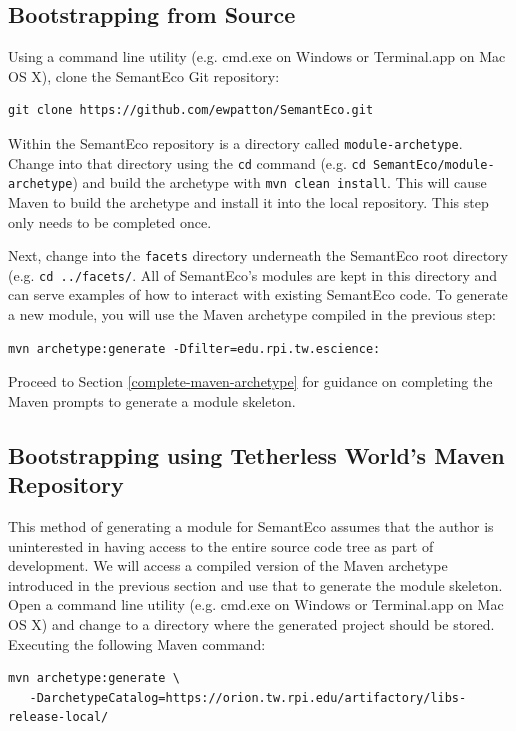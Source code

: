 \documentclass[letterpaper]{report}
\begin{document}
\subsection{Bootstrapping from Source}
Using a command line utility (e.g. cmd.exe on Windows or Terminal.app on Mac OS X), clone the SemantEco Git repository:

\begin{verbatim}
git clone https://github.com/ewpatton/SemantEco.git
\end{verbatim}

Within the SemantEco repository is a directory called \texttt{module-archetype}. Change into that directory using the \texttt{cd} command (e.g. \texttt{cd SemantEco/module-archetype}) and build the archetype with \texttt{mvn clean install}. This will cause Maven to build the archetype and install it into the local repository. This step only needs to be completed once.

Next, change into the \texttt{facets} directory underneath the SemantEco root directory (e.g. \texttt{cd ../facets/}. All of SemantEco's modules are kept in this directory and can serve examples of how to interact with existing SemantEco code. To generate a new module, you will use the Maven archetype compiled in the previous step:

\begin{verbatim}
mvn archetype:generate -Dfilter=edu.rpi.tw.escience:
\end{verbatim}

Proceed to Section \ref{complete-maven-archetype} for guidance on completing the Maven prompts to generate a module skeleton.

\subsection{Bootstrapping using Tetherless World's Maven Repository}
This method of generating a module for SemantEco assumes that the author is uninterested in having access to the entire source code tree as part of development. We will access a compiled version of the Maven archetype introduced in the previous section and use that to generate the module skeleton. Open a command line utility (e.g. cmd.exe on Windows or Terminal.app on Mac OS X) and change to a directory where the generated project should be stored. Executing the following Maven command:

\begin{verbatim}
mvn archetype:generate \
   -DarchetypeCatalog=https://orion.tw.rpi.edu/artifactory/libs-release-local/
\end{verbatim}
\end{document}
